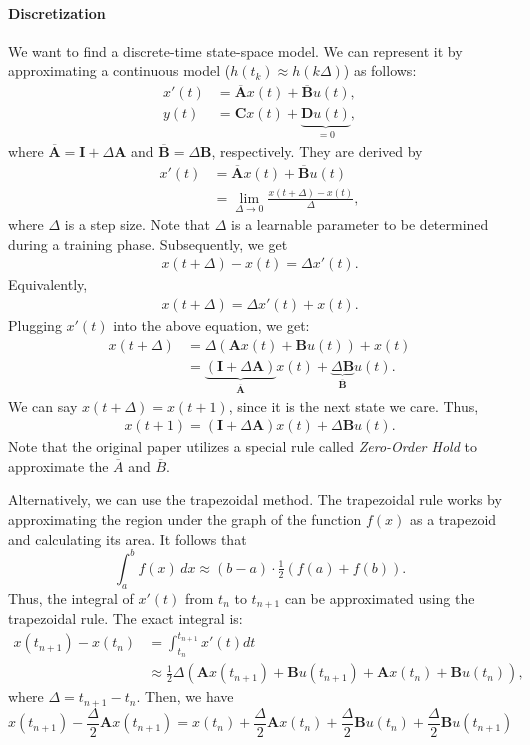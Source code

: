 \paragraph{Discretization} We want to find a discrete-time state-space model. We can represent it by approximating a continuous model (\ie $h(t_k) \approx h(k\Delta)$) as follows:
\begin{align*}
	x'(t) &= \overline{\mathbf{A}}x(t)+\overline{\mathbf{B}}u(t),\\
	y(t) &= \mathbf{C}x(t)+\underbrace{\mathbf{D}u(t)}_{=0},
\end{align*}
where $\overline{\mathbf{A}} = \mathbf{I}+\Delta \mathbf{A}$ and $\overline{\mathbf{B}} = \Delta \mathbf{B}$, respectively. They are derived by
\begin{align*}
	x'(t) &= \overline{\mathbf{A}}x(t)+\overline{\mathbf{B}}u(t)\\
		  &= \lim_{\Delta\to 0} \frac{x(t+\Delta)-x(t)}{\Delta},
\end{align*}
where $\Delta$ is a step size. Note that $\Delta$ is a learnable parameter to be determined during a training phase. Subsequently, we get 
\begin{align*}
	x(t+\Delta)-x(t) = \Delta x'(t).
\end{align*}
Equivalently, 
\begin{align*}
	x(t+\Delta) = \Delta x'(t)+x(t). 
\end{align*}
Plugging $x'(t)$ into the above equation, we get:
\begin{align*}
	x(t+\Delta) &= \Delta (\mathbf{A}x(t)+\mathbf{B}u(t)) +x(t) \\
				&= \underbrace{(\mathbf{I}+\Delta \mathbf{A})}_{\overline{\mathbf{A}}}x(t)+\underbrace{\Delta \mathbf{B}}_{\overline{\mathbf{B}}}u(t).
\end{align*}
We can say $x(t+\Delta)=x(t+1)$, since it is the next state we care. Thus, 
\begin{align*}
	x(t+1)= (\mathbf{I}+\Delta \mathbf{A})x(t)+\Delta \mathbf{B}u(t).
\end{align*}
Note that the original paper utilizes a special rule called \textit{Zero-Order Hold} to approximate the $\overline{A}$ and $\overline{B}$. 

Alternatively, we can use the trapezoidal method. The trapezoidal rule works by approximating the region under the graph of the function $f(x)$ as a trapezoid and calculating its area. It follows that
$$\int _{a}^{b}f(x)\,dx\approx (b-a)\cdot {\tfrac {1}{2}}(f(a)+f(b)).$$
Thus, the integral of $x'(t)$ from $t_n$ to $t_{n+1}$ can be approximated using the trapezoidal rule. The exact integral is:
\begin{align*}
	x(t_{n+1})-x(t_n) &= \int_{t_n}^{t_{n+1}}x'(t)dt\\
					  &\approx \frac{1}{2}\Delta (\mathbf{A}x(t_{n+1})+\mathbf{B}u(t_{n+1})+\mathbf{A}x(t_n) + \mathbf{B}u(t_n)),
\end{align*}
where $\Delta = t_{n+1}-t_n$. Then, we have 
\[ x(t_{n+1}) - \frac{\Delta}{2} \mathbf{A}x(t_{n+1}) = x(t_n) + \frac{\Delta}{2} \mathbf{A}x(t_n) + \frac{\Delta}{2} \mathbf{B}u(t_n) + \frac{\Delta}{2} \mathbf{B}u(t_{n+1}) \]


